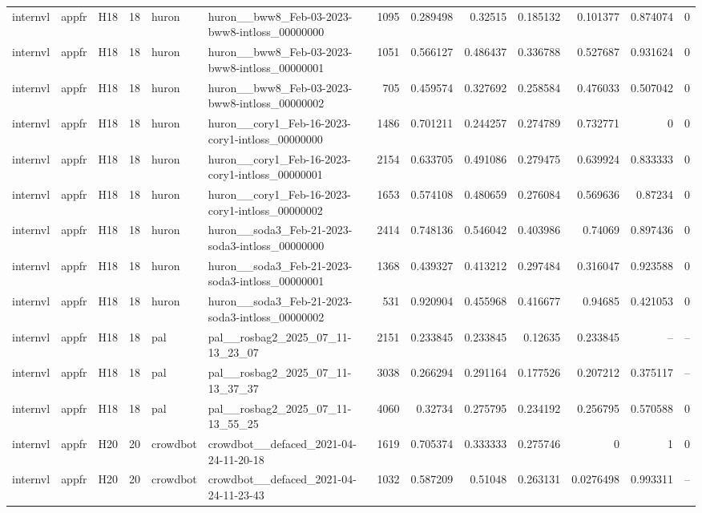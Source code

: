 \begin{longtable}{lllrllrrrrrrr}
internvl & appfr & H18 & 18 & huron & huron\_\_bww8\_Feb-03-2023-bww8-intloss\_00000000 & 1095 & 0.289498 & 0.32515 & 0.185132 & 0.101377 & 0.874074 & 0 \\
internvl & appfr & H18 & 18 & huron & huron\_\_bww8\_Feb-03-2023-bww8-intloss\_00000001 & 1051 & 0.566127 & 0.486437 & 0.336788 & 0.527687 & 0.931624 & 0 \\
internvl & appfr & H18 & 18 & huron & huron\_\_bww8\_Feb-03-2023-bww8-intloss\_00000002 & 705 & 0.459574 & 0.327692 & 0.258584 & 0.476033 & 0.507042 & 0 \\
internvl & appfr & H18 & 18 & huron & huron\_\_cory1\_Feb-16-2023-cory1-intloss\_00000000 & 1486 & 0.701211 & 0.244257 & 0.274789 & 0.732771 & 0 & 0 \\
internvl & appfr & H18 & 18 & huron & huron\_\_cory1\_Feb-16-2023-cory1-intloss\_00000001 & 2154 & 0.633705 & 0.491086 & 0.279475 & 0.639924 & 0.833333 & 0 \\
internvl & appfr & H18 & 18 & huron & huron\_\_cory1\_Feb-16-2023-cory1-intloss\_00000002 & 1653 & 0.574108 & 0.480659 & 0.276084 & 0.569636 & 0.87234 & 0 \\
internvl & appfr & H18 & 18 & huron & huron\_\_soda3\_Feb-21-2023-soda3-intloss\_00000000 & 2414 & 0.748136 & 0.546042 & 0.403986 & 0.74069 & 0.897436 & 0 \\
internvl & appfr & H18 & 18 & huron & huron\_\_soda3\_Feb-21-2023-soda3-intloss\_00000001 & 1368 & 0.439327 & 0.413212 & 0.297484 & 0.316047 & 0.923588 & 0 \\
internvl & appfr & H18 & 18 & huron & huron\_\_soda3\_Feb-21-2023-soda3-intloss\_00000002 & 531 & 0.920904 & 0.455968 & 0.416677 & 0.94685 & 0.421053 & 0 \\
internvl & appfr & H18 & 18 & pal & pal\_\_rosbag2\_2025\_07\_11-13\_23\_07 & 2151 & 0.233845 & 0.233845 & 0.12635 & 0.233845 & -- & -- \\
internvl & appfr & H18 & 18 & pal & pal\_\_rosbag2\_2025\_07\_11-13\_37\_37 & 3038 & 0.266294 & 0.291164 & 0.177526 & 0.207212 & 0.375117 & -- \\
internvl & appfr & H18 & 18 & pal & pal\_\_rosbag2\_2025\_07\_11-13\_55\_25 & 4060 & 0.32734 & 0.275795 & 0.234192 & 0.256795 & 0.570588 & 0 \\
internvl & appfr & H20 & 20 & crowdbot & crowdbot\_\_defaced\_2021-04-24-11-20-18 & 1619 & 0.705374 & 0.333333 & 0.275746 & 0 & 1 & 0 \\
internvl & appfr & H20 & 20 & crowdbot & crowdbot\_\_defaced\_2021-04-24-11-23-43 & 1032 & 0.587209 & 0.51048 & 0.263131 & 0.0276498 & 0.993311 & -- \\

\end{longtable}
